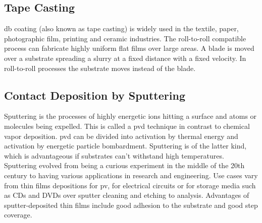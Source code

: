 \subsection{Tape Casting}
%
\Gls{db} coating (also known as tape casting) is widely used in the textile, paper, photographic film, printing and ceramic industries.
The roll-to-roll compatible process can fabricate highly uniform flat films over large areas\cite{yang2010large}.
A blade is moved over a substrate spreading a slurry at a fixed distance with a fixed velocity.
In roll-to-roll processes the substrate moves instead of the blade. 

\subsection{Contact Deposition by Sputtering}
Sputtering is the processes of highly energetic ions hitting a surface and atoms or molecules being expelled. 
This is called a \gls{pvd} technique in contrast to chemical vapor deposition. 
\Gls{pvd} can be divided into activation by thermal energy and activation by energetic particle bombardment. 
Sputtering is of the latter kind, which 
is advantageous if substrates can't withstand high temperatures.
Sputtering evolved from being a curious experiment in the middle of the 20th century to 
having various applications in research and engineering.
Use cases vary from thin films depositions for \gls{pv}, 
for electrical circuits or for storage media such as CDs and DVDs 
over sputter cleaning and etching to analysis.
Advantages of sputter-deposited thin films include good adhesion to the substrate 
and good step coverage\cite{Swann1988}.

